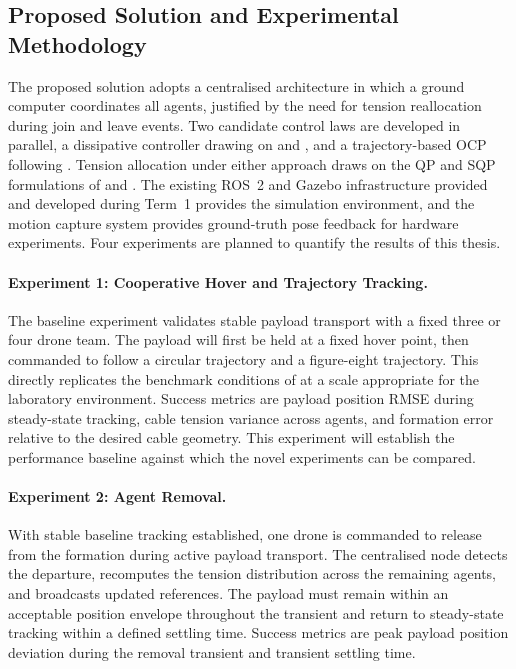\subsection{Proposed Solution and Experimental Methodology}

The proposed solution adopts a centralised architecture in which a ground computer coordinates all agents, justified by the need for tension reallocation during join and leave events. Two candidate control laws are developed in parallel, a dissipative controller drawing on \cite{quan2025swarm} and \cite{liuVirtualTubeBasedCooperativeTransport2026}, and a trajectory-based OCP following \cite{tudelft}. Tension allocation under either approach draws on the QP and SQP formulations of \cite{efficient} and \cite{vazquez-soquiSQPBasedCableTensionAllocation2026}. The existing ROS~2 and Gazebo infrastructure provided and developed during Term~1 provides the simulation environment, and the motion capture system provides ground-truth pose feedback for hardware experiments. Four experiments are planned to quantify the results of this thesis.
\newpage


\paragraph{Experiment 1: Cooperative Hover and Trajectory Tracking.}
The baseline experiment validates stable payload transport with a fixed three or four drone team. The payload will first be held at a fixed hover point, then commanded to follow a circular trajectory and a figure-eight trajectory. This directly replicates the benchmark conditions of \cite{tudelft} at a scale appropriate for the laboratory environment. Success metrics are payload position RMSE during steady-state tracking, cable tension variance across agents, and formation error relative to the desired cable geometry. This experiment will establish the performance baseline against which the novel experiments can be compared.

\paragraph{Experiment 2: Agent Removal.}
With stable baseline tracking established, one drone is commanded to release from the formation during active payload transport. The centralised node detects the departure, recomputes the tension distribution across the remaining agents, and broadcasts updated references. The payload must remain within an acceptable position envelope throughout the transient and return to steady-state tracking within a defined settling time. Success metrics are peak payload position deviation during the removal transient and transient settling time.

